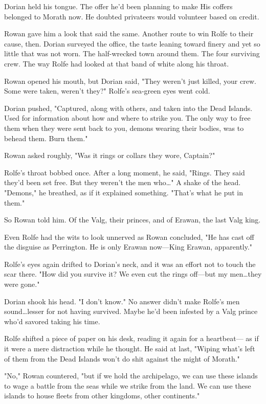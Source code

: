 Dorian held his tongue.
The offer he'd been planning to make 
His coffers belonged to Morath now.
He doubted privateers would volunteer based on credit.

Rowan gave him a look that said the same.
Another route to win Rolfe to their cause, then.
Dorian surveyed the office, the taste leaning toward finery and yet so little that was not worn.
The half-wrecked town around them.
The four surviving crew.
The way Rolfe had looked at that band of white along his throat.

Rowan opened his mouth, but Dorian said, "They weren't just killed, your crew.
Some were taken, weren't they?"
Rolfe's sea-green eyes went cold.

Dorian pushed, "Captured, along with others, and taken into the Dead Islands.
Used for information about how and where to strike you.
The only way to free them when they were sent back to you, demons wearing their bodies, was to behead them.
Burn them."

Rowan asked roughly, "Was it rings or collars they wore, Captain?"

Rolfe's throat bobbed once.
After a long moment, he said, "Rings.
They said they'd been set free.
But they weren't the men who\ldots" A shake of the head.
"Demons," he breathed, as if it explained something.
"That's what he put in them."

So Rowan told him.
Of the Valg, their princes, and of Erawan, the last Valg king.

Even Rolfe had the wits to look unnerved as Rowan concluded, "He has cast off the disguise as Perrington.
He is only Erawan now---King Erawan, apparently."

Rolfe's eyes again drifted to Dorian's neck, and it was an effort not to touch the scar there.
"How did you survive it?
We even cut the rings off---but my men\ldots they were gone."

Dorian shook his head.
"I don't know."
No answer didn't make Rolfe's men sound\ldots lesser for not having survived.
Maybe he'd been infested by a Valg prince who'd savored taking his time.

Rolfe shifted a piece of paper on his desk, reading it again for a heartbeat--- as if it were a mere distraction while he thought.
He said at last, "Wiping what's left of them from the Dead Islands won't do shit against the might of Morath."

"No," Rowan countered, "but if we hold the archipelago, we can use these islands to wage a battle from the seas while we strike from the land.
We can use these islands to house fleets from other kingdoms, other continents."

